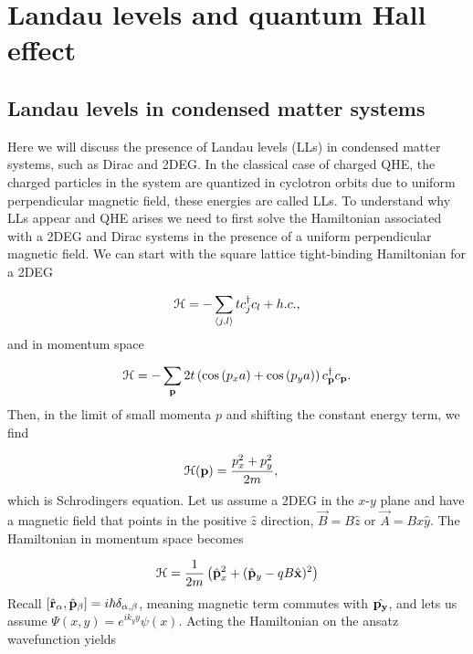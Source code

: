 \section{Landau levels and quantum Hall effect}

\subsection{Landau levels in condensed matter systems}
Here we will discuss the presence of Landau levels (LLs) in condensed matter systems, such as Dirac and 2DEG.
In the classical case of charged QHE, the charged particles in the system are quantized in cyclotron orbits due to uniform perpendicular magnetic field, these energies are called LLs.
To understand why LLs appear and QHE arises we need to first solve the Hamiltonian associated with a 2DEG and Dirac systems in the presence of a uniform perpendicular magnetic field.
We can start with the square lattice tight-binding Hamiltonian for a 2DEG

\begin{equation}
  \mathcal{H} = -\sum_{\langle j,l \rangle} tc^{\dagger}_j c_{l} + h.c.,
\end{equation}
and in momentum space

\begin{equation}
  \mathcal{H} = -\sum_{\mathbf{p}} 2t \left( \cos{(p_x a)} + \cos{(p_y a)} \right) c^{\dagger}_{\mathbf{p}} c_{\mathbf{p}}.
\end{equation}
Then, in the limit of small momenta $p$ and shifting the constant energy term, we find

\begin{align}
  \mathcal{H}(\mathbf{p}) &= \dfrac{p_x^2 + p_y^2}{2m},
\end{align}
which is Schrodingers equation.
Let us assume a 2DEG in the $x$-$y$ plane and have a magnetic field that points in the positive $\hat{z}$ direction, $\vec{B} = B\hat{z}$ or $\vec{A} = Bx\hat{y}$.
The Hamiltonian in momentum space becomes

\begin{equation}
  \ham = \dfrac{1}{2m} \left( \op{p}_x^2 + (\op{p}_y - qB \op{x})^2 \right)
\end{equation}
Recall $[\op{r}_{\alpha}, \op{p}_{\beta}] = i\hbar \delta_{\alpha,\beta}$, meaning magnetic term commutes with $\op{p_y}$, and lets us assume $\Psi(x,y) = e^{ik_y y} \psi(x)$.
Acting the Hamiltonian on the ansatz wavefunction yields

